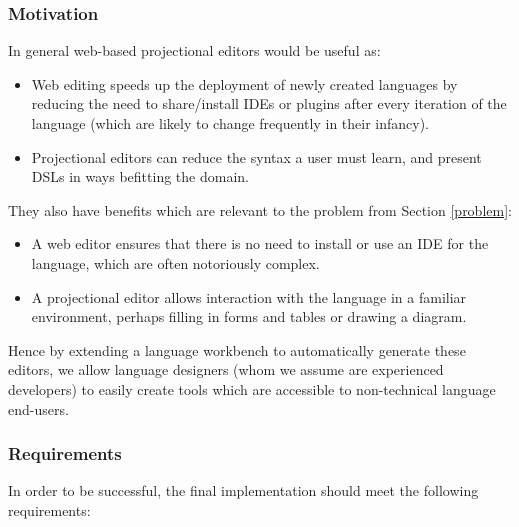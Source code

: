 \documentclass{article}
\begin{document}
\subsubsection{Motivation}\label{motivation}
In general web-based projectional editors would be useful as:
\begin{itemize}
\item Web editing speeds up the deployment of newly created languages by reducing the need to share/install IDEs or plugins after every iteration of the language (which are likely to change frequently in their infancy). 
\item Projectional editors can reduce the syntax a user must learn, and present DSLs in ways befitting the domain.
\end{itemize} 
They also have benefits which are relevant to the problem from Section \ref{problem}:
\begin{itemize}
\item A web editor ensures that there is no need to install or use an IDE for the language, which are often notoriously complex. 
\item A projectional editor allows interaction with the language in a familiar environment, perhaps filling in forms and tables or drawing a diagram.
\end{itemize}
Hence by extending a language workbench to automatically generate these editors, we allow language designers (whom we assume are experienced developers) to easily create tools which are accessible to non-technical language end-users.

\subsubsection{Requirements}\label{requirements}
In order to be successful, the final implementation should meet the following requirements: 
\end{document}
